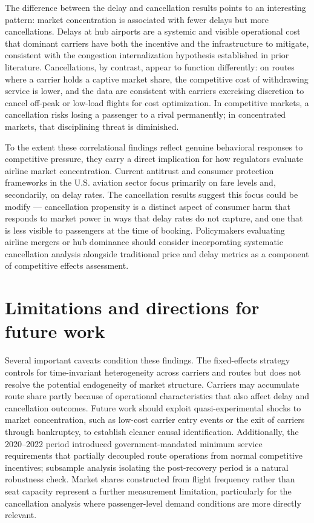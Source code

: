 \documentclass[preprint,12pt,authoryear]{elsarticle}
\begin{document}
The difference between the delay and cancellation results points to an interesting pattern: market concentration is associated with fewer delays but more cancellations. Delays at hub airports are a systemic and visible operational cost that dominant carriers have both the incentive and the infrastructure to mitigate, consistent with the congestion internalization hypothesis established in prior literature. Cancellations, by contrast, appear to function differently: on routes where a carrier holds a captive market share, the competitive cost of withdrawing service is lower, and the data are consistent with carriers exercising discretion to cancel off-peak or low-load flights for cost optimization. In competitive markets, a cancellation risks losing a passenger to a rival permanently; in concentrated markets, that disciplining threat is diminished.

To the extent these correlational findings reflect genuine behavioral responses to competitive pressure, they carry a direct implication for how regulators evaluate airline market concentration. Current antitrust and consumer protection frameworks in the U.S. aviation sector focus primarily on fare levels and, secondarily, on delay rates. The cancellation results suggest this focus could be modify — cancellation propensity is a distinct aspect of consumer harm that responds to market power in ways that delay rates do not capture, and one that is less visible to passengers at the time of booking. Policymakers evaluating airline mergers or hub dominance should consider incorporating systematic cancellation analysis alongside traditional price and delay metrics as a component of competitive effects assessment. 

\section{Limitations and directions for future work}
Several important caveats condition these findings. The fixed-effects strategy controls for time-invariant heterogeneity across carriers and routes but does not resolve the potential endogeneity of market structure. Carriers may accumulate route share partly because of operational characteristics that also affect delay and cancellation outcomes. Future work should exploit quasi-experimental shocks to market concentration, such as low-cost carrier entry events or the exit of carriers through bankruptcy, to establish cleaner causal identification. Additionally, the 2020–2022 period introduced government-mandated minimum service requirements that partially decoupled route operations from normal competitive incentives; subsample analysis isolating the post-recovery period is a natural robustness check. Market shares constructed from flight frequency rather than seat capacity represent a further measurement limitation, particularly for the cancellation analysis where passenger-level demand conditions are more directly relevant.
\end{document}
